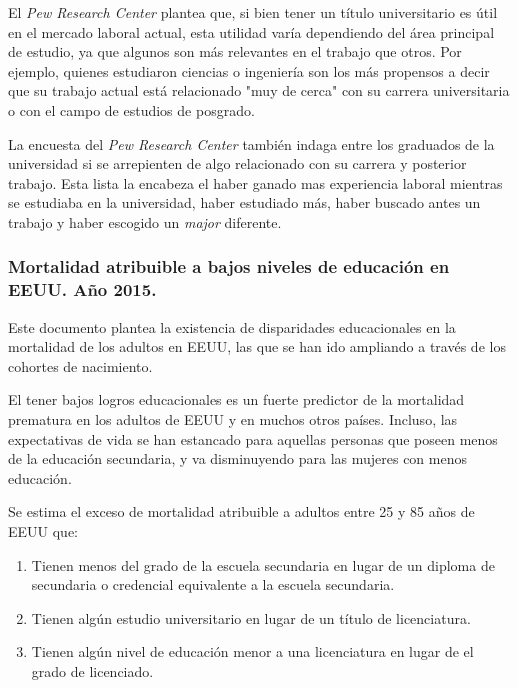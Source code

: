 El \textit{Pew Research Center} plantea que, si bien tener un título universitario es útil en el mercado laboral actual, esta utilidad varía dependiendo del área principal de estudio, ya que algunos son más relevantes en el trabajo que otros. Por ejemplo, quienes estudiaron ciencias o ingeniería son los más propensos a decir que su trabajo actual está relacionado "muy de cerca" con su carrera universitaria o con el campo de estudios de posgrado.

La encuesta del \textit{Pew Research Center} también indaga entre los graduados de la universidad si se arrepienten de algo relacionado con su carrera y posterior trabajo. Esta lista la encabeza el haber ganado mas experiencia laboral mientras se estudiaba en la universidad, haber estudiado más, haber buscado antes un trabajo y haber escogido un \textit{major} diferente. 


\subsubsection{Mortalidad atribuible a bajos niveles de educación en EEUU. Año 2015.}
Este documento plantea la existencia de disparidades educacionales en la mortalidad de los adultos en EEUU, las que se han ido ampliando a través de los cohortes de nacimiento. 

El tener bajos logros educacionales es un fuerte predictor de la mortalidad prematura en los adultos de EEUU y en muchos otros países. Incluso, las expectativas de vida se han estancado para aquellas personas que poseen menos de la educación secundaria, y va disminuyendo para las mujeres con menos educación. 

Se estima el exceso de mortalidad atribuible a adultos entre 25 y 85 años de EEUU que:
\begin{enumerate}
\item Tienen menos del grado de la escuela secundaria en lugar de un diploma de secundaria o credencial equivalente a la escuela secundaria.
\item Tienen algún estudio universitario en lugar de un título de licenciatura.
\item Tienen algún nivel de educación menor a una licenciatura en lugar de el grado de licenciado.
\end{enumerate}

